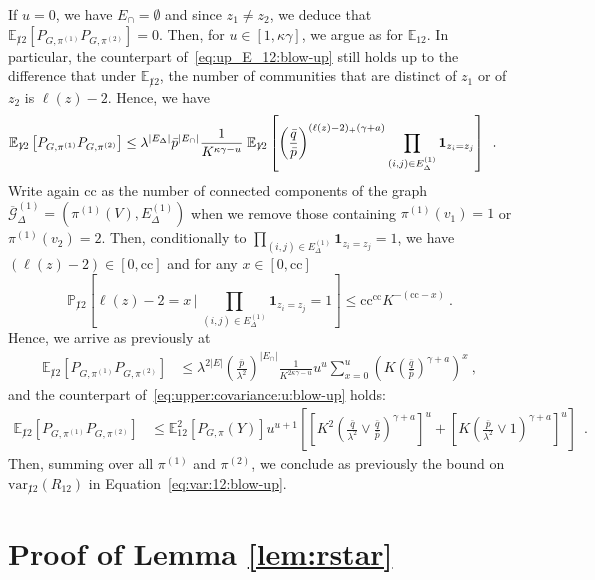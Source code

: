 \documentclass[final]{colt2026}
\newcommand{\1}{\mathbf{1}}
\newcommand{\bbE}{\mathbb{E}}
\newcommand{\cro}[1]{\left[#1\right]}
\begin{document}
If $u=0$, we have $E_{\cap}=\emptyset$ and since $z_1\neq z_2$, we deduce that 
$\bbE_{\not 12}\cro{P_{G,\pi^{(1)}}P_{G,\pi^{(2)}}}=0$.  Then, for $u\in [1, \kappa \gamma]$, we argue as for $\bbE_{12}$. In particular, the counterpart of~\eqref{eq:up_E_12:blow-up} still holds up to the difference that under $\bbE_{\not 12}$, the number of communities that are distinct of $z_1$ or of $z_2$ is $\ell(z)-2$. Hence, we have 
\begin{align*}
\bbE_{\not 12}\cro{P_{G,\pi^{(1)}}P_{G,\pi^{(2)}}}
&\le \lambda^{|E_{\Delta}|}\bar p^{|E_{\cap}|}\frac{1}{K^{\kappa \gamma-u}}
\;\bbE_{\not 12}\cro{\left({\bar q \over \bar p}\right)^{(\ell(z)-2)_+(\gamma + a)} \prod_{(i,j)\in E^{(1)}_{\Delta}}\mathbf 1_{z_{i}=z_{j}}} \enspace . 
\end{align*}
Write again $\mathrm{cc}$ as the number of connected components of the graph $\overline{\mathcal{G}}^{(1)}_{\Delta}=(\pi^{(1)}(V),E^{(1)}_{\Delta})$ when we remove those containing $\pi^{(1)}(v_1)=1$ or  $\pi^{(1)}(v_2)=2$. Then, conditionally to $\prod_{(i,j)\in E^{(1)}_{\Delta}}\mathbf 1_{z_{i}=z_{j}}=1$, we have $(\ell(z)-2)\in [0,\mathrm{cc}]$ and for any $x\in [0,\mathrm{cc}]$ 
\[
\mathbb{P}_{\not 12}\cro{\ell(z)-2= x\,\Bigg|\, \prod_{(i,j)\in E^{(1)}_{\Delta}}\mathbf 1_{z_{i}=z_{j}}=1}\leq \mathrm{cc}^{\mathrm{cc}} K^{-(\mathrm{cc}-x)} \ . 
\]
Hence, we arrive as previously at 
\begin{align*}
\bbE_{\not 12}\cro{P_{G,\pi^{(1)}}P_{G,\pi^{(2)}}}&
 \leq \lambda^{2|E|}\left(\frac{\bar p}{\lambda^2}\right)^{|E_{\cap}|}\frac{1}{K^{2\kappa \gamma-u}} 
  u^u \sum_{x = 0 }^{u} \left(K \left(\frac{\bar q }{\bar p}\right)^{\gamma +a}\right)^{x }\ , 
\end{align*}
and the counterpart of~\eqref{eq:upper:covariance:u:blow-up} holds: 
\begin{align*}\nonumber
\bbE_{\not 12}\cro{P_{G,\pi^{(1)}}P_{G,\pi^{(2)}}}
&\leq \bbE^2_{12}\cro{P_{G,\pi}(Y)}  u^{u+1} \left[\left[K^2  \left(\frac{\bar{q}}{\lambda^2}\vee \frac{\bar{q}}{\bar p } \right)^{\gamma + a}\right]^u  + \left[K \left(\frac{\bar{p}}{\lambda^2}\vee 1 \right)^{\gamma + a}\right]^u   \right] \enspace . 
\end{align*}
Then, summing over all $\pi^{(1)}$ and $\pi^{(2)}$, we conclude as previously 
the bound on $\mathrm{var}_{\not 12}(R_{12})$
 in Equation~\eqref{eq:var:12:blow-up}.






\section{Proof of Lemma \ref{lem:rstar}}\label{sec:signal}
\end{document}
